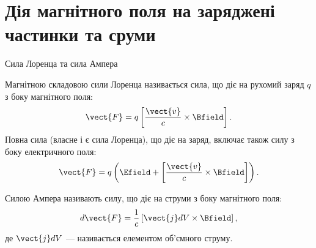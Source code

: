 \documentclass{beamer}
\begin{document}
\section{Дія магнітного поля на заряджені частинки та сруми}



\begin{frame}{Сила Лоренца та сила Ампера}{}
	\begin{block}{}
		Магнітною складовою сили Лоренца називається сила, що діє на рухомий заряд $q$ з боку магнітного поля:
		\begin{equation*}
			\vect{F} = q\left[\frac{\vect{v}}{c}\times\Bfield\right].
		\end{equation*}
		Повна сила (власне і є сила Лоренца), що діє на заряд, включає також силу з боку електричного поля:
		\begin{equation*}
			\vect{F} = q\left( \Efield + \left[\frac{\vect{v}}{c}\times\Bfield\right] \right) .
		\end{equation*}
	\end{block}
	\begin{block}{}
		\alert{Силою Ампера} називають силу, що діє на струми з боку магнітного поля:
		\begin{equation*}
			d\vect{F} = \frac1c \left[ \vect{j}dV \times \Bfield\right],
		\end{equation*}
		де $\vect{j} dV$ --- називається \alert{елементом об'ємного струму}.
	\end{block}
\end{frame}
\end{document}
